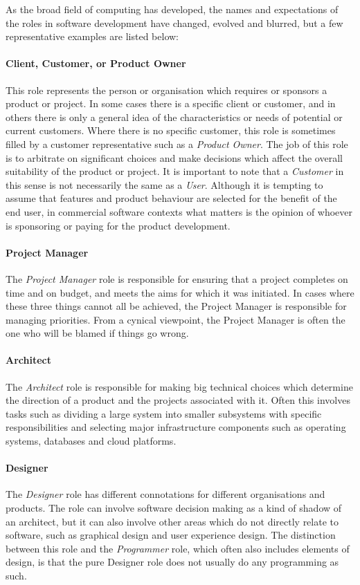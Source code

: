 As the broad field of computing has developed, the names and expectations of the roles in software development have changed, evolved and blurred, but a few representative examples are listed below:

\paragraph{Client, Customer, or Product Owner}
This role represents the person or organisation which requires or sponsors a product or project. In some cases there is a specific client or customer, and in others there is only a general idea of the characteristics or needs of potential or current customers. Where there is no specific customer, this role is sometimes filled by a customer representative such as a \emph{Product Owner}. The job of this role is to arbitrate on significant choices and make decisions which affect the overall suitability of the product or project. It is important to note that a \emph{Customer} in this sense is not necessarily the same as a \emph{User}. Although it is tempting to assume that features and product behaviour are selected for the benefit of the end user, in commercial software contexts what matters is the opinion of whoever is sponsoring or paying for the product development.

\paragraph{Project Manager}
The \emph{Project Manager} role is responsible for ensuring that a project completes on time and on budget, and meets the aims for which it was initiated. In cases where these three things cannot all be achieved, the Project Manager is responsible for managing priorities. From a cynical viewpoint, the Project Manager is often the one who will be blamed if things go wrong.

\paragraph{Architect}
The \emph{Architect} role is responsible for making big technical choices which determine the direction of a product and the projects associated with it. Often this involves tasks such as dividing a large system into smaller subsystems with specific responsibilities and selecting major infrastructure components such as operating systems, databases and cloud platforms.

\paragraph{Designer}
The \emph{Designer} role has different connotations for different organisations and products. The role can involve software decision making as a kind of shadow of an architect, but it can also involve other areas which do not directly relate to software, such as graphical design and user experience design. The distinction between this role and the \emph{Programmer} role, which often also includes elements of design, is that the pure Designer role does not usually do any programming as such.

